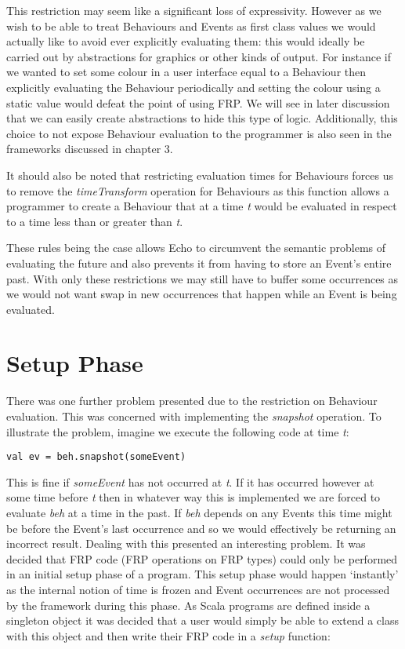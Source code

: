     This restriction may seem like a significant loss of expressivity. However as we wish to be able to treat
    Behaviours and Events as first class values we would actually like to avoid ever explicitly evaluating
    them: this would ideally be carried out by abstractions for graphics or other kinds of output. For instance
    if we wanted to set some colour in a user interface equal to a Behaviour then explicitly evaluating the Behaviour
    periodically and setting the colour using a static value would defeat the point of using FRP. We will see in later
    discussion that we can easily create abstractions to hide this type of logic. Additionally, this
    choice to not expose Behaviour evaluation to the programmer is also seen in the frameworks
    discussed in chapter 3.
    
    It should also be noted that restricting evaluation times for Behaviours forces us
    to remove the \emph{timeTransform} operation for Behaviours as this function allows
    a programmer to create a Behaviour that at a time \emph{t} would be evaluated in respect
    to a time less than or greater than \emph{t}.
    
    These rules being the case allows Echo to circumvent the semantic problems of evaluating the future
    and also prevents it from having to store an Event's entire past. With only these restrictions we may still have to
    buffer some occurrences as we would not want swap in new occurrences that happen while an Event is being evaluated.
    
    \section{Setup Phase}
      There was one further problem presented due to the restriction on Behaviour evaluation. This was concerned with
      implementing the \emph{snapshot} operation. To illustrate the problem, imagine we execute the following code
      at time \emph{t}:

\begin{verbatim}
val ev = beh.snapshot(someEvent)
\end{verbatim}

      This is fine if \emph{someEvent} has not occurred at \emph{t}. If it has occurred however at some time
      before \emph{t} then in whatever way this is implemented we are forced to evaluate \emph{beh}
      at a time in the past. If \emph{beh} depends on any Events this time might be before the Event's
      last occurrence and so we would effectively be returning an incorrect result. Dealing with this
      presented an interesting problem. It was decided that FRP
      code (FRP operations on FRP types) could only be performed in an initial setup phase of a program.
      This setup phase would happen `instantly' as the internal notion of time is frozen and Event
      occurrences are not processed by the framework during this phase. As Scala programs are defined inside a singleton
      object it was decided that a user would simply be able to extend a class with this object and then
      write their FRP code in a \emph{setup} function:

